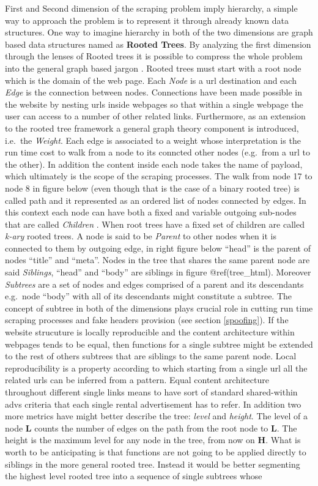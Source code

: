 \documentclass[
  12pt,
  a4paper,
  oneside]{book}
\begin{document}
First and Second dimension of the scraping problem imply hierarchy, a simple way to approach the problem is to represent it through already known data structures. One way to imagine hierarchy in both of the two dimensions are graph based data structures named as \textbf{Rooted Trees}. By analyzing the first dimension through the lenses of Rooted trees it is possible to compress the whole problem into the general graph based jargon \citep{Graph_Diestel}. Rooted trees must start with a root node which is the domain of the web page. Each \emph{Node} is a url destination and each \emph{Edge} is the connection between nodes. Connections have been made possible in the website by nesting urls inside webpages so that within a single webpage the user can access to a number of other related links. Furthermore, as an extension to the rooted tree framework a general graph theory component is introduced, i.e.~the \emph{Weight}. Each edge is associated to a weight whose interpretation is the run time cost to walk from a node to its conncted other nodes (e.g.~from a url to the other). In addition the content inside each node takes the name of payload, which ultimately is the scope of the scraping processes. The walk from node 17 to node 8 in figure below (even though that is the case of a binary rooted tree) is called path and it represented as an ordered list of nodes connected by edges. In this context each node can have both a fixed and variable outgoing sub-nodes that are called \emph{Children} . When root trees have a fixed set of children are called \emph{k-ary} rooted trees. A node is said to be \emph{Parent} to other nodes when it is connected to them by outgoing edge, in right figure below ``head'' is the parent of nodes ``title'' and ``meta''. Nodes in the tree that shares the same parent node are said \emph{Siblings}, ``head'' and ``body'' are siblings in figure @ref(tree\_html). Moreover \emph{Subtrees} are a set of nodes and edges comprised of a parent and its descendants e.g.~node ``body'' with all of its descendants might constitute a subtree. The concept of subtree in both of the dimensions plays crucial role in cutting run time scraping processes and fake headers provision (see section \ref{spoofing}). If the website strucuture is locally reproducible and the content architecture within webpages tends to be equal, then functions for a single subtree might be extended to the rest of others subtrees that are siblings to the same parent node. Local reproducibility is a property according to which starting from a single url all the related urls can be inferred from a pattern. Equal content architecture throughout different single links means to have sort of standard shared-within advs criteria that each single rental advertisement has to refer. In addition two more metrics have might better describe the tree: \emph{level} and \emph{height}. The level of a node \(\mathbf{L}\) counts the number of edges on the path from the root node to \(\mathbf{L}\). The height is the maximum level for any node in the tree, from now on \(\mathbf{H}\). What is worth to be anticipating is that functions are not going to be applied directly to siblings in the more general rooted tree. Instead it would be better segmenting the highest level rooted tree into a sequence of single subtrees whose 
\end{document}
